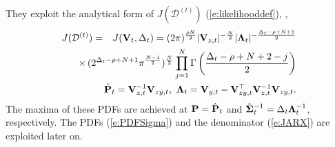 They exploit the analytical form of $J(\mathcal{D}^{(t)})$
(\ref{e:likelihooddef}), \cite{Pet:81},
\begin{eqnarray}
\nonumber
J(\mathcal{D}^{(t)})&=&J(\mat{V}_{t},\Delta_{t})=
(2\pi)^{\frac{\rho N}{2}}|\mat{V}_{z,t}|^{-\frac{N}{2}}
|\mat{\Lambda}_{t}|^{-\frac{\Delta_{t}-\rho+N+1}{2}}\\
\label{e:JARX}
&&\hspace*{-14ex}\times\,
(2^{\Delta_{t}-\rho+N+1}\pi^{\frac{N-1}{2}})^{\frac{N}{2}}
\prod_{j=1}^N\Gamma\left(\frac{\Delta_{t}-\rho+N+2-j}{2}\right)\\
\label{e:points}
&&\hspace*{-12ex}\hat{\mat{P}}_{t}=\mat{V}_{z,t}^{-1}\mat{V}_{zy,t},\ \mat{\Lambda}_{t}=\mat{V}_{y,t}
-  \mat{V}_{zy,t}^{\top}\mat{V}_{z,t}^{-1}\mat{V}_{zy,t}.
\end{eqnarray}
 The maxima of these PDFs are achieved at $\mathbf{P} = \hat{\mathbf{P}}_{t}$ and $\hat{\mathbf{\Sigma}}_{t}^{-1} = \Delta_{t}\mathbf{\Lambda}_{t}^{-1}$, respectively. The PDFs (\ref{e:PDFSigma}) and the denominator (\ref{e:JARX}) are exploited later on.

